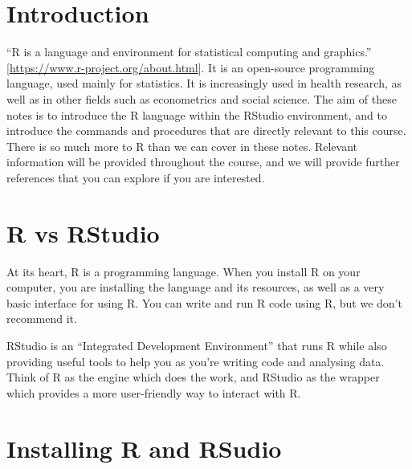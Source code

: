 \documentclass[
]{memoir}
\begin{document}
\hypertarget{introduction}{%
\section{Introduction}\label{introduction}}

``R is a language and environment for statistical computing and graphics.'' {[}\url{https://www.r-project.org/about.html}{]}. It is an open-source programming language, used mainly for statistics. It is increasingly used in health research, as well as in other fields such as econometrics and social science. The aim of these notes is to introduce the R language within the RStudio environment, and to introduce the commands and procedures that are directly relevant to this course. There is so much more to R than we can cover in these notes. Relevant information will be provided throughout the course, and we will provide further references that you can explore if you are interested.

\hypertarget{r-vs-rstudio}{%
\section{R vs RStudio}\label{r-vs-rstudio}}

At its heart, R is a programming language. When you install R on your computer, you are installing the language and its resources, as well as a very basic interface for using R. You can write and run R code using R, but we don't recommend it.

RStudio is an ``Integrated Development Environment'' that runs R while also providing useful tools to help you as you're writing code and analysing data. Think of R as the engine which does the work, and RStudio as the wrapper which provides a more user-friendly way to interact with R.

\hypertarget{installing-r-and-rsudio}{%
\section{Installing R and RSudio}\label{installing-r-and-rsudio}}
\end{document}
